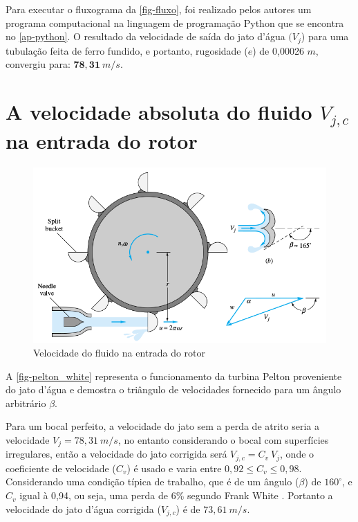     Para executar o fluxograma da \autoref{fig-fluxo}, foi realizado pelos autores um programa computacional na linguagem de programação Python que se encontra no \autoref{ap-python}. O resultado da velocidade de saída do jato d'água $(V_j$) para uma tubulação feita de ferro fundido, e portanto, rugosidade ($e$) de 0,00026 $m$, convergiu para: $\mathbf{78,31\:} m/s$.

    \section{A velocidade absoluta do fluido $V_{j,c}$ na entrada do rotor}

    \begin{figure}[htb]
        \centering
        \caption{\label{fig-pelton_white} Velocidade do fluido na entrada do rotor}
        \includegraphics[scale=0.5]{images/pelton_turbine.png}
    \end{figure}
    A \autoref{fig-pelton_white} representa o funcionamento da turbina Pelton proveniente do jato d'água e demostra o triângulo de velocidades fornecido para um ângulo arbitrário $\beta$.

    Para um bocal perfeito, a velocidade do jato sem a perda de atrito seria a velocidade $V_j = 78,31 \: m/s$, no entanto considerando o bocal com superfícies irregulares, então a velocidade do jato corrigida será $V_{j,c} =  C_v \: V_{j}$, onde o coeficiente de velocidade ($C_v$) é usado e varia entre $0,92 \leq C_v \leq 0,98$. Considerando uma condição típica de trabalho, que é de um ângulo ($\beta$) de $160^{\circ}$, e $C_v$ igual à 0,94, ou seja, uma perda de 6\% segundo Frank White \cite{white}. Portanto a velocidade do jato d'água corrigida ($V_{j,c}$) é de  $73,61\: m/s$.

